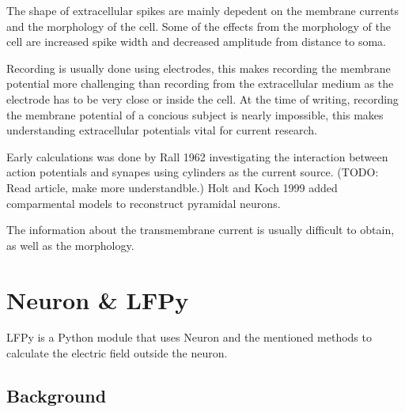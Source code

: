 \documentclass[altfont, fleqn]{uiophd}
\begin{document}
The shape of extracellular spikes are mainly depedent on the membrane currents
and the morphology of the cell. 
Some of the effects from the morphology of the cell are increased spike width and
decreased amplitude from distance to soma. 


Recording is usually done using electrodes, this makes recording the membrane potential
more challenging than recording from the extracellular medium as the electrode
has to be very close or inside the cell. 
At the time of writing,
recording the membrane potential of a concious subject is nearly impossible,
this makes understanding extracellular potentials vital for current research. 


Early calculations was done by Rall 1962 investigating 
the interaction between action potentials and synapes using cylinders
as the current source. (TODO: Read article, make more understandble.)
Holt and Koch 1999 added comparmental models to reconstruct pyramidal neurons. 

The information about the transmembrane current is usually difficult to obtain,
as well as the morphology.


\section{Neuron \& LFPy }
LFPy is a Python module that uses Neuron and the mentioned methods to calculate the 
electric field outside the neuron. 
\cite{linden_lfpy:_2013}
\subsection*{Background}
\end{document}
